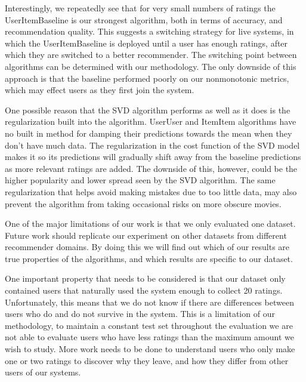 \documentclass[letterpaper]{sig-alternate}
\begin{document}
  Interestingly, we repeatedly see that for very small numbers of ratings the UserItemBaseline is our strongest algorithm, both in terms of accuracy, and recommendation quality.
  This suggests a switching strategy for live systems, in which the UserItemBaseline is deployed until a user has enough ratings, after which they are switched to a better recommender.
  The switching point between algorithms can be determined with our methodology.
  The only downside of this approach is that the baseline performed poorly on our nonmonotonic metrics, which may effect users as they first join the system.
  

  One possible reason that the SVD algorithm performs as well as it does is the regularization built into the algorithm.
  UserUser and ItemItem algorithms have no built in method for damping their predictions towards the mean when they don't have much data.
  The regularization in the cost function of the SVD model makes it so its predictions will gradually shift away from the baseline predictions as more relevant ratings are added.
  The downside of this, however, could be the higher popularity and lower spread seen by the SVD algorithm.
  The same regularization that helps avoid making mistakes due to too little data, may also prevent the algorithm from taking occasional risks on more obscure movies.
  


  One of the major limitations of our work is that we only evaluated one dataset.
  Future work should replicate our experiment on other datasets from different recommender domains.
  By doing this we will find out which of our results are true properties of the algorithms, and which results are specific to our dataset.

  One important property that needs to be considered is that our dataset only contained users that naturally used the system enough to collect 20 ratings.
  Unfortunately, this means that we do not know if there are differences between users who do and do not survive in the system.
  This is a limitation of our methodology, to maintain a constant test set throughout the evaluation we are not able to evaluate users who have less ratings than the maximum amount we wish to study.
  More work needs to be done to understand users who only  make one or two ratings to discover why they leave, and how they differ from other users of our systems.
\end{document}
